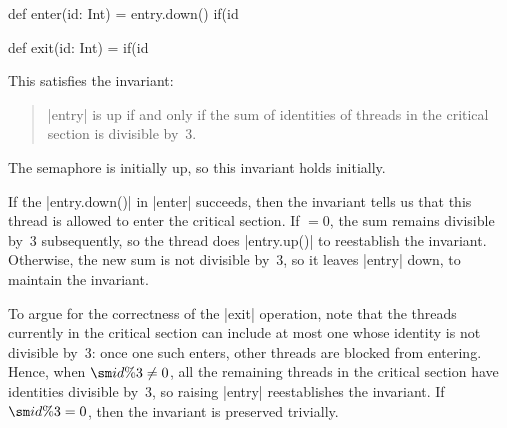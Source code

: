 \begin{answerI}
\begin{scala}
{  def enter(id: Int) = {
    entry.down()
    if(id%
  }

  def exit(id: Int) = if(id%
}
\end{scala}
%
This satisfies the invariant:
\begin{quote}
   |entry| is up if and only if the sum of identities of threads in the
   critical section is divisible by~3.
\end{quote}
%
The semaphore is initially up, so this invariant holds initially.

If the |entry.down()| in |enter| succeeds, then the invariant tells us that
this thread is allowed to enter the critical section.  If $ = 0$,
the sum remains divisible by~3 subsequently, so the thread does |entry.up()|
to reestablish the invariant.  Otherwise, the new sum is not divisible by~3,
so it leaves |entry| down, to maintain the invariant.

To argue for the correctness of the |exit| operation, note that the threads
currently in the critical section can include at most one whose identity is not
divisible by~3: once one such enters, other threads are blocked from entering.
Hence, when $\sm{id\%}3 \ne 0$, all the remaining threads in the critical
section have identities divisible by~3, so raising |entry| reestablishes the
invariant.  If ${\sm{id\%}3 = 0}$, then the invariant is preserved trivially.
\end{answerI}

